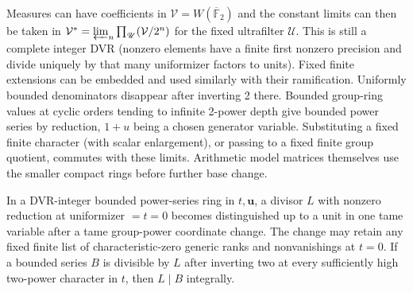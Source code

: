\begin{remark}\label{rem:foundations-measures}
Measures can have coefficients in \(\mathcal V=W(\overline{\mathbb F}_2)\) and the constant limits can then be taken in \(\mathcal V^*=\varprojlim_n\prod_{\mathscr U}(\mathcal V/2^n)\) for the fixed ultrafilter \(\mathscr U\). This is still a complete integer DVR (nonzero elements have a finite first nonzero precision and divide uniquely by that many uniformizer factors to units). Fixed finite extensions can be embedded and used similarly with their ramification. Uniformly bounded denominators disappear after inverting 2 there. Bounded group-ring values at cyclic orders tending to infinite 2-power depth give bounded power series by reduction, \(1+u\) being a chosen generator variable. Substituting a fixed finite character (with scalar enlargement), or passing to a fixed finite group quotient, commutes with these limits. Arithmetic model matrices themselves use the smaller compact rings before further base change.
\end{remark}

\begin{lemma}\label{lem:foundations-series}
In a DVR-integer bounded power-series ring in \(t,\mathbf u\), a divisor \(L\) with nonzero reduction at uniformizer \(=t=0\) becomes distinguished up to a unit in one tame variable after a tame group-power coordinate change. The change may retain any fixed finite list of characteristic-zero generic ranks and nonvanishings at \(t=0\). If a bounded series \(B\) is divisible by \(L\) after inverting two at every sufficiently high two-power character in \(t\), then \(L\mid B\) integrally.
\end{lemma}

